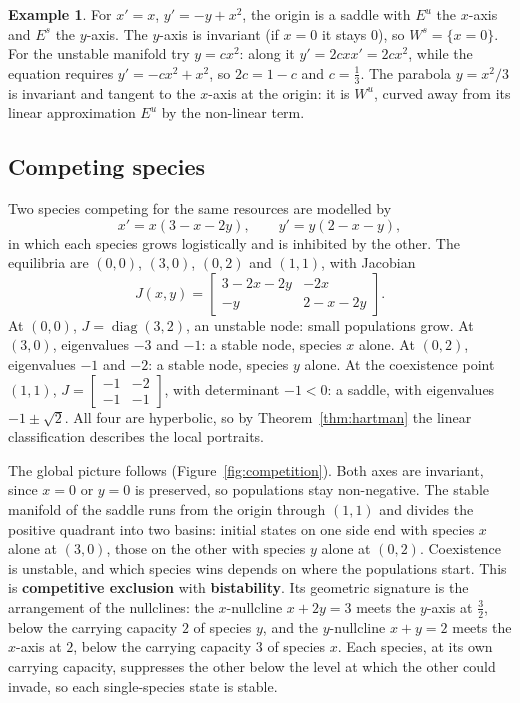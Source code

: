 \documentclass[11pt,a4paper]{article}
\numberwithin{equation}{section}
\theoremstyle{definition}
\newtheorem{exa}[thm]{Example}
\begin{document}
\begin{exa}
\label{ex:manifold}
For $x' = x$, $y' = -y + x^2$, the origin is a saddle with $E^u$ the $x$-axis and $E^s$ the $y$-axis. The $y$-axis is invariant (if $x = 0$ it stays $0$), so $W^s = \{x = 0\}$. For the unstable manifold try $y = cx^2$:
along it $y' = 2cxx' = 2cx^2$, while the equation requires $y' = -cx^2 + x^2$, so $2c = 1 - c$ and $c = \frac13$. The parabola $y = x^2/3$ is invariant and tangent to the $x$-axis at the origin: it is $W^u$, curved away from
its linear approximation $E^u$ by the non-linear term.
\end{exa}

\subsection{Competing species}
\label{ssec:competition}

Two species competing for the same resources are modelled by
\[
x' = x(3 - x - 2y), \qquad y' = y(2 - x - y),
\]
in which each species grows logistically and is inhibited by the other. The equilibria are $(0, 0)$, $(3, 0)$, $(0, 2)$ and $(1, 1)$, with Jacobian
\[
J(x, y) = \begin{bmatrix} 3 - 2x - 2y & -2x\\ -y & 2 - x - 2y\end{bmatrix} .
\]
At $(0, 0)$, $J = \operatorname{diag}(3, 2)$, an unstable node: small populations grow. At $(3, 0)$, eigenvalues $-3$ and $-1$: a stable node, species $x$ alone. At $(0, 2)$, eigenvalues $-1$ and $-2$: a stable
node, species $y$ alone. At the coexistence point $(1, 1)$, $J = \begin{bmatrix} -1 & -2\\ -1 & -1\end{bmatrix}$, with determinant $-1 < 0$: a saddle, with eigenvalues $-1 \pm \sqrt2$. All four are hyperbolic, so by
Theorem~\ref{thm:hartman} the linear classification describes the local portraits.

The global picture follows (Figure~\ref{fig:competition}). Both axes are invariant, since $x = 0$ or $y = 0$ is preserved, so populations stay non-negative. The stable manifold of the saddle
runs from the origin through $(1, 1)$ and divides the positive quadrant into two basins: initial states on one side end with species $x$ alone at $(3, 0)$, those on the other with species $y$
alone at $(0, 2)$. Coexistence is unstable, and which species wins depends on where the populations start. This is \textbf{competitive exclusion} with \textbf{bistability}. Its geometric signature is the arrangement of
the nullclines: the $x$-nullcline $x + 2y = 3$ meets the $y$-axis at $\frac32$, below the carrying capacity $2$ of species $y$, and the $y$-nullcline $x + y = 2$ meets the $x$-axis at $2$, below the carrying
capacity $3$ of species $x$. Each species, at its own carrying capacity, suppresses the other below the level at which the other could invade, so each single-species state is stable.
\end{document}
